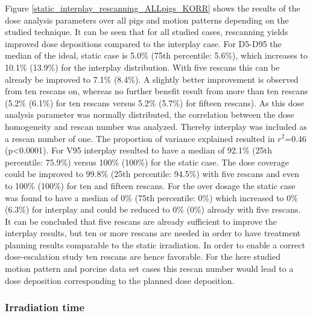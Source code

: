 Figure \ref{static_interplay_rescanning_ALLpigs_KORR} shows the results of the dose analysis parameters over all pigs and motion patterns 
depending on the studied technique. It can be seen that for all studied cases, rescanning yields improved dose depositions compared to the 
interplay case. For D5-D95 the median of the ideal, static case is 5.0\% (75th percentile: 5.6\%), which 
increases to 10.1\% (13.9\%) for the interplay distribution. With five rescans this can be already be improved to 7.1\% (8.4\%). A slightly 
better improvement is observed from ten rescans on, whereas no further benefit result from more than ten rescans (5.2\% (6.1\%) for ten rescans 
versus 5.2\% (5.7\%) for fifteen rescans). As this dose analysis parameter was normally distributed, the correlation between the dose homogeneity 
and rescan number was analyzed. Thereby interplay was included as a rescan number of one. 
The proportion of variance explained resulted in $r^{2}$=0.46 (p<0.0001). 
For V95 interplay resulted to have a median of 92.1\% (25th percentile: 75.9\%) versus 100\% (100\%) for the static case. The dose coverage 
could be improved to 99.8\% (25th percentile: 94.5\%) with five rescans and even to 100\% (100\%) for ten and fifteen rescans. 
For the over dosage the static case was found to have a median of 0\% (75th percentile: 0\%) which increased to 0\% (6.3\%) for interplay and 
could be reduced to 0\% (0\%) already with five rescans.\newline
\newline
It can be concluded that five rescans are already sufficient to improve the interplay results, but ten or more rescans are needed in order 
to have treatment planning results comparable to the static irradiation. 
In order to enable a correct dose-escalation study ten rescans are hence favorable. For the here studied motion pattern and porcine data 
set cases this rescan number would lead to a dose deposition corresponding to the planned dose deposition. 

\newpage

\subsubsection{Irradiation time}

